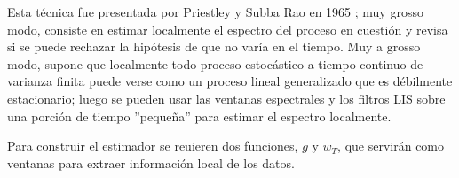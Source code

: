 Esta t\'ecnica fue presentada por Priestley y Subba Rao en 1965 \cite{Priestley69}; 
muy grosso modo, consiste en estimar localmente  el espectro
del proceso en cuesti\'on y revisa si se puede rechazar la hip\'otesis de que no
var\'ia en el tiempo.
%
Muy a grosso modo, supone que localmente todo proceso estoc\'astico a tiempo continuo de varianza 
finita puede verse como un proceso lineal generalizado que es d\'ebilmente estacionario;
luego se pueden usar las ventanas espectrales y los filtros LIS sobre una porci\'on 
de tiempo ''peque\~na'' para estimar el espectro localmente.




Para construir el estimador se reuieren dos funciones, $g$ y $w_T$, que servir\'an como ventanas
para extraer informaci\'on local de los datos. 


